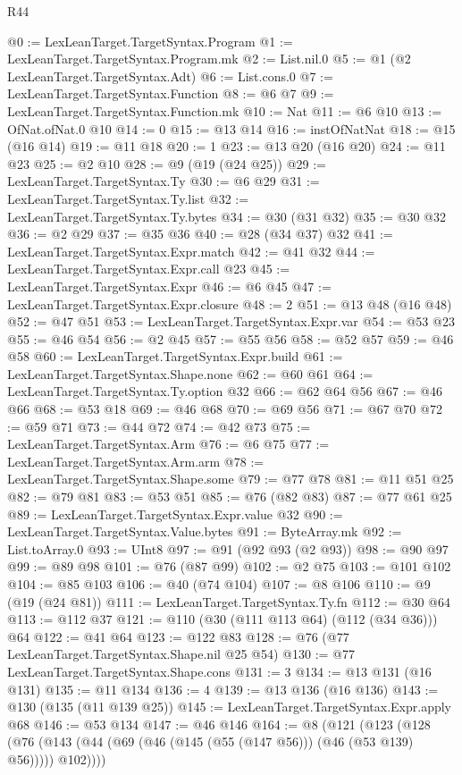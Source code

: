 \begin{lexlean}{R44}
\begin{coremodule}
@0 := LexLeanTarget.TargetSyntax.Program
@1 := LexLeanTarget.TargetSyntax.Program.mk
@2 := List.nil.{0}
@5 := @1 (@2 LexLeanTarget.TargetSyntax.Adt)
@6 := List.cons.{0}
@7 := LexLeanTarget.TargetSyntax.Function
@8 := @6 @7
@9 := LexLeanTarget.TargetSyntax.Function.mk
@10 := Nat
@11 := @6 @10
@13 := OfNat.ofNat.{0} @10
@14 := 0
@15 := @13 @14
@16 := instOfNatNat
@18 := @15 (@16 @14)
@19 := @11 @18
@20 := 1
@23 := @13 @20 (@16 @20)
@24 := @11 @23
@25 := @2 @10
@28 := @9 (@19 (@24 @25))
@29 := LexLeanTarget.TargetSyntax.Ty
@30 := @6 @29
@31 := LexLeanTarget.TargetSyntax.Ty.list
@32 := LexLeanTarget.TargetSyntax.Ty.bytes
@34 := @30 (@31 @32)
@35 := @30 @32
@36 := @2 @29
@37 := @35 @36
@40 := @28 (@34 @37) @32
@41 := LexLeanTarget.TargetSyntax.Expr.match
@42 := @41 @32
@44 := LexLeanTarget.TargetSyntax.Expr.call @23
@45 := LexLeanTarget.TargetSyntax.Expr
@46 := @6 @45
@47 := LexLeanTarget.TargetSyntax.Expr.closure
@48 := 2
@51 := @13 @48 (@16 @48)
@52 := @47 @51
@53 := LexLeanTarget.TargetSyntax.Expr.var
@54 := @53 @23
@55 := @46 @54
@56 := @2 @45
@57 := @55 @56
@58 := @52 @57
@59 := @46 @58
@60 := LexLeanTarget.TargetSyntax.Expr.build
@61 := LexLeanTarget.TargetSyntax.Shape.none
@62 := @60 @61
@64 := LexLeanTarget.TargetSyntax.Ty.option @32
@66 := @62 @64 @56
@67 := @46 @66
@68 := @53 @18
@69 := @46 @68
@70 := @69 @56
@71 := @67 @70
@72 := @59 @71
@73 := @44 @72
@74 := @42 @73
@75 := LexLeanTarget.TargetSyntax.Arm
@76 := @6 @75
@77 := LexLeanTarget.TargetSyntax.Arm.arm
@78 := LexLeanTarget.TargetSyntax.Shape.some
@79 := @77 @78
@81 := @11 @51 @25
@82 := @79 @81
@83 := @53 @51
@85 := @76 (@82 @83)
@87 := @77 @61 @25
@89 := LexLeanTarget.TargetSyntax.Expr.value @32
@90 := LexLeanTarget.TargetSyntax.Value.bytes
@91 := ByteArray.mk
@92 := List.toArray.{0}
@93 := UInt8
@97 := @91 (@92 @93 (@2 @93))
@98 := @90 @97
@99 := @89 @98
@101 := @76 (@87 @99)
@102 := @2 @75
@103 := @101 @102
@104 := @85 @103
@106 := @40 (@74 @104)
@107 := @8 @106
@110 := @9 (@19 (@24 @81))
@111 := LexLeanTarget.TargetSyntax.Ty.fn
@112 := @30 @64
@113 := @112 @37
@121 := @110 (@30 (@111 @113 @64) (@112 (@34 @36))) @64
@122 := @41 @64
@123 := @122 @83
@128 := @76 (@77 LexLeanTarget.TargetSyntax.Shape.nil @25 @54)
@130 := @77 LexLeanTarget.TargetSyntax.Shape.cons
@131 := 3
@134 := @13 @131 (@16 @131)
@135 := @11 @134
@136 := 4
@139 := @13 @136 (@16 @136)
@143 := @130 (@135 (@11 @139 @25))
@145 := LexLeanTarget.TargetSyntax.Expr.apply @68
@146 := @53 @134
@147 := @46 @146
@164 := @8
    (@121
      (@123
        (@128 (@76 (@143 (@44 (@69 (@46 (@145 (@55 (@147 @56))) (@46 (@53 @139) @56))))) @102))))

\end{coremodule}
\end{lexlean}
